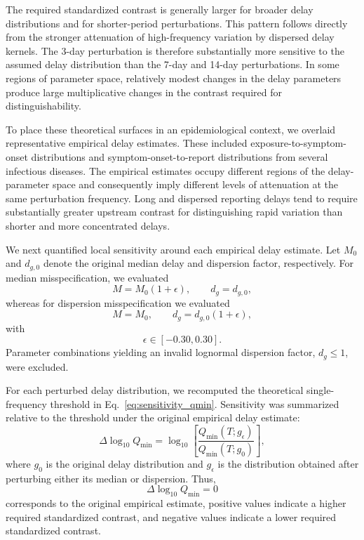 The required standardized contrast is generally larger for broader delay distributions and for shorter-period perturbations. This pattern follows directly from the stronger attenuation of high-frequency variation by dispersed delay kernels. The 3-day perturbation is therefore substantially more sensitive to the assumed delay distribution than the 7-day and 14-day perturbations. In some regions of parameter space, relatively modest changes in the delay parameters produce large multiplicative changes in the contrast required for distinguishability.

To place these theoretical surfaces in an epidemiological context, we overlaid representative empirical delay estimates. These included exposure-to-symptom-onset distributions and symptom-onset-to-report distributions from several infectious diseases. The empirical estimates occupy different regions of the delay-parameter space and consequently imply different levels of attenuation at the same perturbation frequency. Long and dispersed reporting delays tend to require substantially greater upstream contrast for distinguishing rapid variation than shorter and more concentrated delays.

We next quantified local sensitivity around each empirical delay estimate. Let \(M_0\) and \(d_{g,0}\) denote the original median delay and dispersion factor, respectively. For median misspecification, we evaluated
\[
M = M_0(1+\epsilon),
\qquad
d_g=d_{g,0},
\]
whereas for dispersion misspecification we evaluated
\[
M=M_0,
\qquad
d_g=d_{g,0}(1+\epsilon),
\]
with
\[
\epsilon\in[-0.30,0.30].
\]
Parameter combinations yielding an invalid lognormal dispersion factor, \(d_g\leq 1\), were excluded.

For each perturbed delay distribution, we recomputed the theoretical single-frequency threshold in Eq.~\eqref{eq:sensitivity_qmin}. Sensitivity was summarized relative to the threshold under the original empirical delay estimate:
\begin{equation}
\Delta\log_{10} Q_{\min}
=
\log_{10}
\left[
\frac{Q_{\min}(T;g_{\epsilon})}
     {Q_{\min}(T;g_{0})}
\right],
\label{eq:sensitivity_relative_qmin}
\end{equation}
where \(g_0\) is the original delay distribution and \(g_{\epsilon}\) is the distribution obtained after perturbing either its median or dispersion. Thus,
\[
\Delta\log_{10}Q_{\min}=0
\]
corresponds to the original empirical estimate, positive values indicate a higher required standardized contrast, and negative values indicate a lower required standardized contrast.

